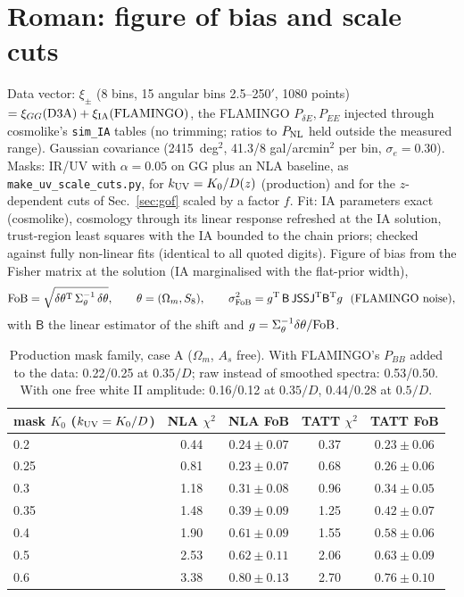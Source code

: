 \documentclass[11pt]{article}
\begin{document}
\section{Roman: figure of bias and scale cuts}\label{sec:roman}
Data vector: $\xi_\pm$ (8 bins, 15 angular bins 2.5--250$'$, 1080 points) $=\xi_{GG}({\rm D3A})+\xi_{\rm IA}({\rm FLAMINGO})$, the FLAMINGO $P_{\delta E},P_{EE}$ injected through cosmolike's \texttt{sim\_IA} tables (no trimming; ratios to $P_{\rm NL}$ held outside the measured range). Gaussian covariance (2415~deg$^2$, 41.3/8 gal/arcmin$^2$ per bin, $\sigma_e=0.30$). Masks: IR/UV with $\alpha=0.05$ on GG plus an NLA baseline, as \texttt{make\_uv\_scale\_cuts.py}, for $k_{\rm UV}=K_0/D(z)$ (production) and for the $z$-dependent cuts of Sec.~\ref{sec:gof} scaled by a factor $f$. Fit: IA parameters exact (cosmolike), cosmology through its linear response refreshed at the IA solution, trust-region least squares with the IA bounded to the chain priors; checked against fully non-linear fits (identical to all quoted digits). Figure of bias from the Fisher matrix at the solution (IA marginalised with the flat-prior width),
\begin{equation}
{\rm FoB}=\sqrt{\delta\theta^{\rm T}\,\Sigma_\theta^{-1}\,\delta\theta},\qquad \theta=(\Omega_m,S_8),\qquad
\sigma^2_{\rm FoB}=g^{\rm T}\,\mathsf{B}\,\mathsf{J}\mathsf{S}\mathsf{S}\mathsf{J}^{\rm T}\mathsf{B}^{\rm T}g\ \ (\text{FLAMINGO noise}),
\end{equation}
with $\mathsf{B}$ the linear estimator of the shift and $g=\Sigma_\theta^{-1}\delta\theta/{\rm FoB}$.

\begin{table}[H]\centering\small
\begin{tabular}{l|cc|cc}
\toprule
mask $K_0$ ($k_{\rm UV}=K_0/D$) & NLA $\chi^2$ & NLA FoB & TATT $\chi^2$ & TATT FoB\\
\midrule
0.2 & 0.44 & $0.24\pm0.07$ & 0.37 & $0.23\pm0.06$\\
0.25 & 0.81 & $0.23\pm0.07$ & 0.68 & $0.26\pm0.06$\\
0.3 & 1.18 & $0.31\pm0.08$ & 0.96 & $0.34\pm0.05$\\
0.35 & 1.48 & $0.39\pm0.09$ & 1.25 & $0.42\pm0.07$\\
0.4 & 1.90 & $0.61\pm0.09$ & 1.55 & $0.58\pm0.06$\\
0.5 & 2.53 & $0.62\pm0.11$ & 2.06 & $0.63\pm0.09$\\
0.6 & 3.38 & $0.80\pm0.13$ & 2.70 & $0.76\pm0.10$\\
\bottomrule
\end{tabular}
\caption{Production mask family, case A ($\Omega_m$, $A_s$ free). With FLAMINGO's $P_{BB}$ added to the data: 0.22/0.25 at $0.35/D$; raw instead of smoothed spectra: 0.53/0.50. With one free white II amplitude: 0.16/0.12 at $0.35/D$, 0.44/0.28 at $0.5/D$.}
\end{table}
\end{document}
